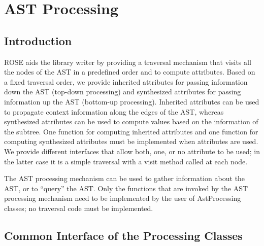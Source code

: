 
\chapter{AST Processing}
\label{AstProcessing:astProcessing}


\section{Introduction}
\label{AstProcessing:introduction}

ROSE aids the library writer by providing a traversal
mechanism that visits all the nodes of the AST in a predefined order
and to compute attributes.  Based on a fixed traversal order, we
provide inherited attributes for passing information down the AST (top-down processing) and synthesized attributes for passing information up
the AST (bottom-up processing). Inherited attributes can be used to
propagate context information along the edges of the AST, whereas
synthesized attributes can be used to compute values based on the
information of the subtree.  One function for computing inherited
attributes and one function for computing synthesized attributes must
be implemented when attributes are used.  We provide different
interfaces that allow both, one, or no attribute to be used; in
the latter case it is a simple traversal with a visit method called at
each node.

The AST processing mechanism can be used to gather information
about the AST, or to ``query'' the AST. Only the functions that are
invoked by the AST processing mechanism need to be implemented by the user
of AstProcessing classes; no traversal code must be implemented.

\section{Common Interface of the Processing Classes}

